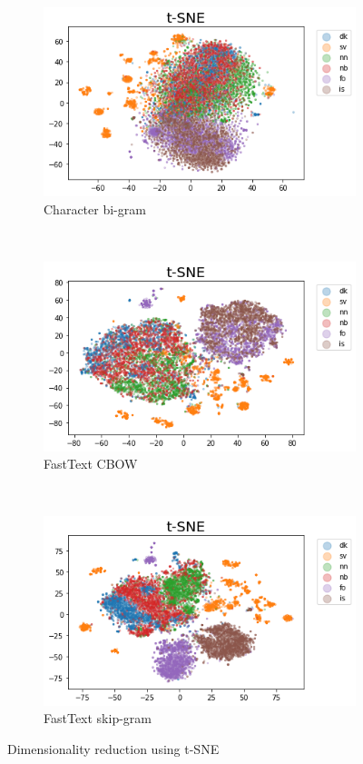 \begin{figure}[h!]
    \centering
    \begin{subfigure}[b]{0.47\textwidth}
        \includegraphics[width=\textwidth]{figs/tsnechar2}
        \caption{Character bi-gram}
    \end{subfigure}
    ~
    \begin{subfigure}[b]{0.47\textwidth}
        \includegraphics[width=\textwidth]{figs/tsnecbow1}
        \caption{FastText CBOW}
    \end{subfigure}
    ~
    \begin{subfigure}[b]{0.47\textwidth}
        \includegraphics[width=\textwidth]{figs/tsneskipgram1}
        \caption{FastText skip-gram}
    \end{subfigure}
    \caption{Dimensionality reduction using t-SNE}
    \label{tsne}
\end{figure}


